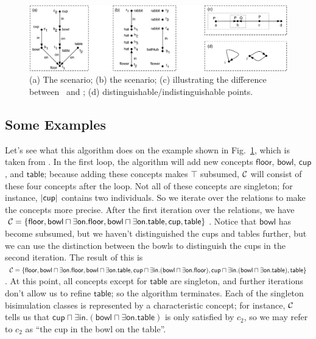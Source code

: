 \begin{figure}
  \centering
  \includegraphics[width=\textwidth]{pic-dale-haddock}
  \caption{(a) The 
    scenario; (b) the  scenario; (c) illustrating
    the difference between \el\ and \alc; (d)
    distinguishable/indistinguishable points.}
  \label{fig:dale-haddock}
\end{figure}


\subsection{Some Examples}

Let's see what this algorithm does on the example shown in
Fig.~\ref{fig:dale-haddock}, which is taken from
.  In the first loop,
the algorithm will add new concepts $\mathsf{floor}$, $\mathsf{bowl}$,
$\mathsf{cup}$, and $\mathsf{table}$; because adding these concepts
makes $\top$ subsumed, $\mathcal{C}$ will consist of these four concepts after
the loop.  Not all of these concepts are singleton; for instance,
$|\mathsf{cup}|$ contains two individuals.  So we iterate over
the relations to make the concepts more precise.  After the first
iteration over the relations, we have $\mathcal{C} = \{ \mathsf{floor},
\mathsf{bowl} \sqcap \exists \mathsf{on}.\mathsf{floor}, \mathsf{bowl}
\sqcap \exists \mathsf{on}.\mathsf{table}, \mathsf{cup},
\mathsf{table} \}$. Notice that $\mathsf{bowl}$ has become subsumed,
but we haven't distinguished the cups and tables further, but we can
use the distinction between the bowls to distinguish the cups in the
second iteration.  The result of this is $\mathcal{C} = \{ \mathsf{floor},
\mathsf{bowl} \sqcap \exists \mathsf{on}.\mathsf{floor}, \mathsf{bowl}
\sqcap \exists \mathsf{on}.\mathsf{table}, \mathsf{cup} \sqcap \exists
\mathsf{in}. (\mathsf{bowl} \sqcap \exists
\mathsf{on}.\mathsf{floor}), \mathsf{cup} \sqcap \exists
\mathsf{in}. (\mathsf{bowl} \sqcap \exists
\mathsf{on}.\mathsf{table}), \mathsf{table} \}$.  At this point, all
concepts except for $\mathsf{table}$ are singleton, and further
iterations don't allow us to refine $\mathsf{table}$; so the algorithm
terminates.  Each of the singleton bisimulation classes is represented
by a characteristic concept; for instance, $\mathcal{C}$ tells us that
$\mathsf{cup} \sqcap \exists \mathsf{in}. (\mathsf{bowl} \sqcap
\exists \mathsf{on}.\mathsf{table})$ is only satisfied by $c_2$, so we
may refer to $c_2$ as ``the cup in the bowl on the table''.

